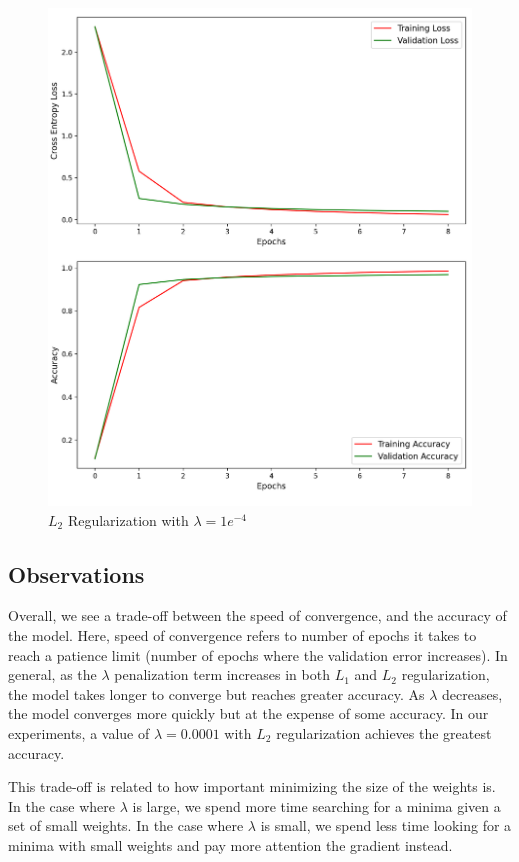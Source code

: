 \begin{figure}[H]
	\centering
	\includegraphics[width=1.0\textwidth]{./images/l2_e4.png}
	\caption{$L_2$ Regularization with $\lambda = 1e^{-4}$}
	\label{fig:l2_1e4}
\end{figure}

\subsection{Observations}
Overall, we see a trade-off between the speed of convergence, and the accuracy of the model. Here, speed of convergence refers to number of epochs it takes to reach a patience limit (number of epochs where the validation error increases). In general, as the $\lambda$ penalization term increases in both $L_1$ and $L_2$ regularization, the model takes longer to converge but reaches greater accuracy. As $\lambda$ decreases, the model converges more quickly but at the expense of some accuracy. In our experiments, a value of $\lambda = 0.0001$ with $L_2$ regularization achieves the greatest accuracy.

This trade-off is related to how important minimizing the size of the weights is. In the case where $\lambda$ is large, we spend more time searching for a minima given a set of small weights. In the case where $\lambda$ is small, we spend less time looking for a minima with small weights and pay more attention the gradient instead.

